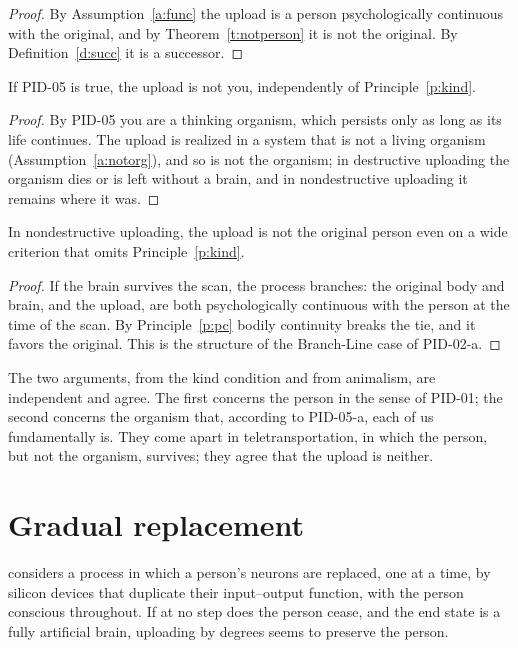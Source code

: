 \documentclass{situationist-preprint}
\begin{document}
\begin{proof}
By Assumption~\ref{a:func} the upload is a person psychologically continuous with the original, and by Theorem~\ref{t:notperson} it is not the original. By Definition~\ref{d:succ} it is a successor.
\end{proof}

\begin{proposition}\label{p:animal}
If PID-05 is true, the upload is not you, independently of Principle~\ref{p:kind}.
\end{proposition}

\begin{proof}
By PID-05 you are a thinking organism, which persists only as long as its life continues. The upload is realized in a system that is not a living organism (Assumption~\ref{a:notorg}), and so is not the organism; in destructive uploading the organism dies or is left without a brain, and in nondestructive uploading it remains where it was.
\end{proof}

\begin{proposition}\label{p:branch}
In nondestructive uploading, the upload is not the original person even on a wide criterion that omits Principle~\ref{p:kind}.
\end{proposition}

\begin{proof}
If the brain survives the scan, the process branches: the original body and brain, and the upload, are both psychologically continuous with the person at the time of the scan. By Principle~\ref{p:pc} bodily continuity breaks the tie, and it favors the original. This is the structure of the Branch-Line case of PID-02-a.
\end{proof}

The two arguments, from the kind condition and from animalism, are independent and agree. The first concerns the person in the sense of PID-01; the second concerns the organism that, according to PID-05-a, each of us fundamentally is. They come apart in teletransportation, in which the person, but not the organism, survives; they agree that the upload is neither.

\section{Gradual replacement}\label{s:gradual}

\citet{Chalmers2010} considers a process in which a person's neurons are replaced, one at a time, by silicon devices that duplicate their input--output function, with the person conscious throughout. If at no step does the person cease, and the end state is a fully artificial brain, uploading by degrees seems to preserve the person.
\end{document}
